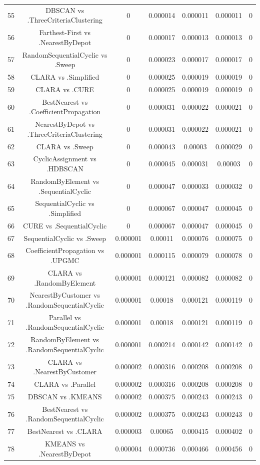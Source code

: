 \documentclass[a4paper,10pt]{article}
\begin{document}
\begin{landscape}
\begin{table}[!htp]
\begin{tabular}{ccccccc}
55&DBSCAN vs .ThreeCriteriaClustering&0&0.000014&0.000011&0.000011&0\\
56&Farthest-First vs .NearestByDepot&0&0.000017&0.000013&0.000013&0\\
57&RandomSequentialCyclic vs .Sweep&0&0.000023&0.000017&0.000017&0\\
58&CLARA vs .Simplified&0&0.000025&0.000019&0.000019&0\\
59&CLARA vs .CURE&0&0.000025&0.000019&0.000019&0\\
60&BestNearest vs .CoefficientPropagation&0&0.000031&0.000022&0.000021&0\\
61&NearestByDepot vs .ThreeCriteriaClustering&0&0.000031&0.000022&0.000021&0\\
62&CLARA vs .Sweep&0&0.000043&0.00003&0.000029&0\\
63&CyclicAssignment vs .HDBSCAN&0&0.000045&0.000031&0.00003&0\\
64&RandomByElement vs .SequentialCyclic&0&0.000047&0.000033&0.000032&0\\
65&SequentialCyclic vs .Simplified&0&0.000067&0.000047&0.000045&0\\
66&CURE vs .SequentialCyclic&0&0.000067&0.000047&0.000045&0\\
67&SequentialCyclic vs .Sweep&0.000001&0.00011&0.000076&0.000075&0\\
68&CoefficientPropagation vs .UPGMC&0.000001&0.000115&0.000079&0.000078&0\\
69&CLARA vs .RandomByElement&0.000001&0.000121&0.000082&0.000082&0\\
70&NearestByCustomer vs .RandomSequentialCyclic&0.000001&0.00018&0.000121&0.000119&0\\
71&Parallel vs .RandomSequentialCyclic&0.000001&0.00018&0.000121&0.000119&0\\
72&RandomByElement vs .RandomSequentialCyclic&0.000001&0.000214&0.000142&0.000142&0\\
73&CLARA vs .NearestByCustomer&0.000002&0.000316&0.000208&0.000208&0\\
74&CLARA vs .Parallel&0.000002&0.000316&0.000208&0.000208&0\\
75&DBSCAN vs .KMEANS&0.000002&0.000375&0.000243&0.000243&0\\
76&BestNearest vs .RandomSequentialCyclic&0.000002&0.000375&0.000243&0.000243&0\\
77&BestNearest vs .CLARA&0.000003&0.00065&0.000415&0.000402&0\\
78&KMEANS vs .NearestByDepot&0.000004&0.000736&0.000466&0.000456&0\\

\end{tabular}
\end{table}
\end{landscape}
\end{document}
